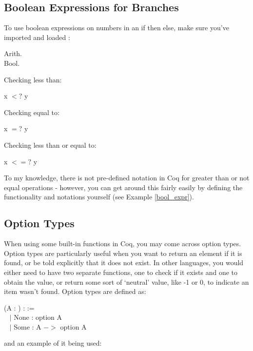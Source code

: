 \subsection{Boolean Expressions for Branches} \label{subsec: bool_expr} 
To use boolean expressions on numbers in an if then else, make sure you've imported  and loaded :
\begin{code}
	 Arith.	\\
	\Load Bool.
\end{code}

Checking less than:
\begin{code}
	x $<?$ y 
\end{code}

Checking equal to:
\begin{code}
	x $=?$ y
\end{code}

Checking less than or equal to:
\begin{code}
	x $<=?$ y
\end{code}

\noindent
To my knowledge, there is not pre-defined notation in Coq for greater than or not equal operations - however, you can get around this fairly easily by defining the functionality and notations yourself  (see Example \ref{bool_expr}).






\subsection{Option Types} \label{subsec: opt_ty}
When using some built-in functions in Coq, you may come across option types. 
Option types are particularly useful when you want to return an element if it is found, or be told explicitly that it does not exist.
In other languages, you would either need to have two separate functions, one to check if it exists and one to obtain the value, or return some sort of `neutral' value, like -1 or 0, to indicate an item wasn't found.
Option types are defined as: 

\begin{code} 
	\Inductive {} (A : \Type) : \Type :=	\\ \-\ \quad
	$\mid$ None : option A					\\ \-\ \quad
	$\mid$ Some : A $->$ option A
\end{code}

and an example of it being used:

